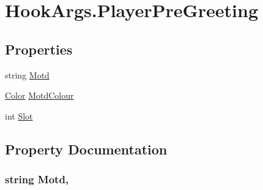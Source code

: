 \hypertarget{structOTA_1_1Plugin_1_1HookArgs_1_1PlayerPreGreeting}{}\section{Hook\+Args.\+Player\+Pre\+Greeting}
\label{structOTA_1_1Plugin_1_1HookArgs_1_1PlayerPreGreeting}
\subsection*{Properties}
\begin{DoxyCompactItemize}
\item 
string \hyperlink{structOTA_1_1Plugin_1_1HookArgs_1_1PlayerPreGreeting_a6787ad4ffe6162225d741646c32d680e}{Motd}
\item 
\hyperlink{structMicrosoft_1_1Xna_1_1Framework_1_1Color}{Color} \hyperlink{structOTA_1_1Plugin_1_1HookArgs_1_1PlayerPreGreeting_a00aeeb6a2307fcf4d9fec2c938509e2c}{Motd\+Colour}
\item 
int \hyperlink{structOTA_1_1Plugin_1_1HookArgs_1_1PlayerPreGreeting_a845a62ef01927ccc8bd45a41de3996f1}{Slot}
\end{DoxyCompactItemize}


\subsection{Property Documentation}
\hypertarget{structOTA_1_1Plugin_1_1HookArgs_1_1PlayerPreGreeting_a6787ad4ffe6162225d741646c32d680e}{}
\subsubsection[{Motd}]{\setlength{\rightskip}{0pt plus 5cm}string Motd\hspace{0.3cm}{\ttfamily [get]}, {\ttfamily [set]}}\label{structOTA_1_1Plugin_1_1HookArgs_1_1PlayerPreGreeting_a6787ad4ffe6162225d741646c32d680e}
\hypertarget{structOTA_1_1Plugin_1_1HookArgs_1_1PlayerPreGreeting_a00aeeb6a2307fcf4d9fec2c938509e2c}{}
